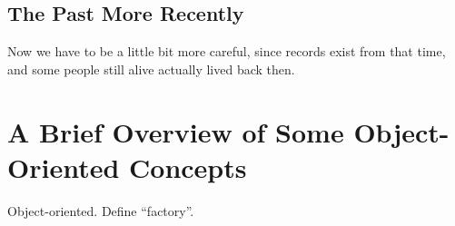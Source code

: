 \documentclass[12pt,strict]{SANDreport}
\begin{document}
	\subsection{The Past More Recently}
	    Now we have to be a little bit more careful, since
	    records exist from that time, and some people still
	    alive actually lived back then.


\section{A Brief Overview of Some Object-Oriented Concepts}
\label{sect:OOTutorial}
Object-oriented.
Define ``factory''.

    \begin{SANDdistribution}
	\bigskip




    \end{SANDdistribution}
\end{document}
